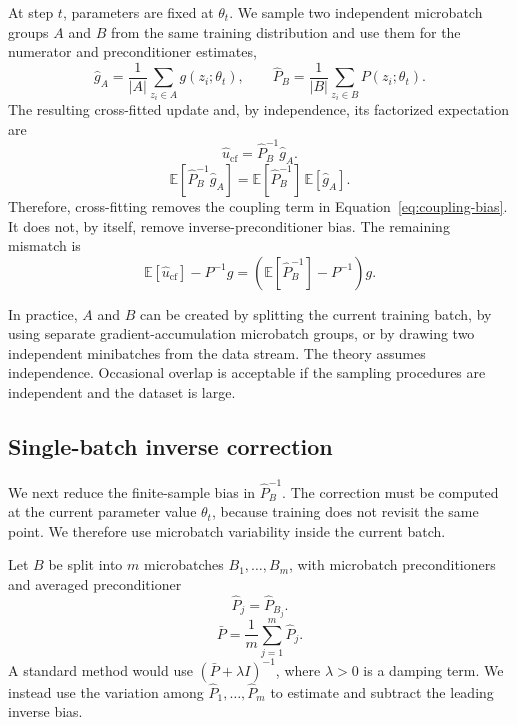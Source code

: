 \documentclass{article}
\newcommand{\E}{\mathbb{E}}
\begin{document}
At step $t$, parameters are fixed at $\theta_t$. We sample two independent microbatch groups $A$ and $B$ from the same training distribution and use them for the numerator and preconditioner estimates,
\begin{equation}
    \hat g_A
    =
    \frac{1}{|A|}\sum_{z_i\in A} g(z_i;\theta_t),
    \qquad
    \hat P_B
    =
    \frac{1}{|B|}\sum_{z_i\in B} P(z_i;\theta_t).
\end{equation}
The resulting cross-fitted update and, by independence, its factorized expectation are
\begin{equation}
    \hat u_{\mathrm{cf}}
    =
    \hat P_B^{-1}\hat g_A.
    \label{eq:crossfit-update}
\end{equation}
\begin{equation}
    \E[\hat P_B^{-1}\hat g_A]
    =
    \E[\hat P_B^{-1}]\,\E[\hat g_A].
\end{equation}
Therefore, cross-fitting removes the coupling term in Equation~\eqref{eq:coupling-bias}. It does not, by itself, remove inverse-preconditioner bias. The remaining mismatch is
\begin{equation}
    \E[\hat u_{\mathrm{cf}}] - P^{-1}g
    =
    \left(\E[\hat P_B^{-1}] - P^{-1}\right)g.
\end{equation}

In practice, $A$ and $B$ can be created by splitting the current training batch, by using separate gradient-accumulation microbatch groups, or by drawing two independent minibatches from the data stream. The theory assumes independence. Occasional overlap is acceptable if the sampling procedures are independent and the dataset is large.

\subsection{Single-batch inverse correction}

We next reduce the finite-sample bias in $\hat P_B^{-1}$. The correction must be computed at the current parameter value $\theta_t$, because training does not revisit the same point. We therefore use microbatch variability inside the current batch.

Let $B$ be split into $m$ microbatches $B_1,\ldots,B_m$, with microbatch preconditioners and averaged preconditioner
\begin{equation}
    \hat P_j = \hat P_{B_j}.
\end{equation}
\begin{equation}
    \bar P = \frac{1}{m}\sum_{j=1}^m \hat P_j.
\end{equation}
A standard method would use $(\bar P+\lambda I)^{-1}$, where $\lambda>0$ is a damping term. We instead use the variation among $\hat P_1,\ldots,\hat P_m$ to estimate and subtract the leading inverse bias.
\end{document}

